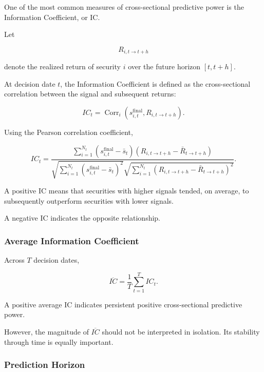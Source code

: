\documentclass[11pt,a4paper]{article}
\begin{document}
One of the most common measures of cross-sectional predictive power is the
Information Coefficient, or IC.

Let

\begin{equation}
R_{i,t\rightarrow t+h}
\end{equation}

denote the realized return of security $i$ over the future horizon
$[t,t+h]$.

At decision date $t$, the Information Coefficient is defined as the
cross-sectional correlation between the signal and subsequent returns:

\begin{equation}
\boxed{
IC_t
=
\operatorname{Corr}_i
\left(
s_{i,t}^{\mathrm{final}},
R_{i,t\rightarrow t+h}
\right).
}
\end{equation}

Using the Pearson correlation coefficient,

\begin{equation}
IC_t
=
\frac{
\sum_{i=1}^{N_t}
\left(
s_{i,t}^{\mathrm{final}}
-
\bar{s}_t
\right)
\left(
R_{i,t\rightarrow t+h}
-
\bar{R}_{t\rightarrow t+h}
\right)
}{
\sqrt{
\sum_{i=1}^{N_t}
\left(
s_{i,t}^{\mathrm{final}}
-
\bar{s}_t
\right)^2
}
\sqrt{
\sum_{i=1}^{N_t}
\left(
R_{i,t\rightarrow t+h}
-
\bar{R}_{t\rightarrow t+h}
\right)^2
}
}.
\end{equation}

A positive IC means that securities with higher signals tended, on average, to
subsequently outperform securities with lower signals.

A negative IC indicates the opposite relationship.


\subsubsection{Average Information Coefficient}

Across $T$ decision dates,

\begin{equation}
\boxed{
\overline{IC}
=
\frac{1}{T}
\sum_{t=1}^{T}
IC_t.
}
\end{equation}

A positive average IC indicates persistent positive cross-sectional predictive
power.

However, the magnitude of $\overline{IC}$ should not be interpreted in
isolation. Its stability through time is equally important.


\subsubsection{Prediction Horizon}
\end{document}
